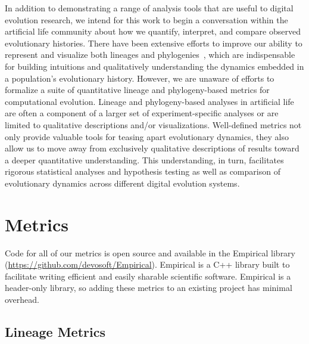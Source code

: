 \documentclass[letterpaper]{article}
\begin{document}
In addition to demonstrating a range of analysis tools that are useful to digital evolution research, we intend for this work to begin a conversation within the artificial life community about how we quantify, interpret, and compare observed evolutionary histories. There have been extensive efforts to improve our ability to represent and visualize both lineages and phylogenies~\citep{standish_visualising_2002,burlacu_visualization_2013, mcphee_using_2016,mcphee_visualizing_2016, lalejini_evolutionary_2016}, which are indispensable for building intuitions and qualitatively understanding the dynamics embedded in a population's evolutionary history. However, we are unaware of efforts to formalize a suite of quantitative lineage and phylogeny-based metrics for computational evolution. Lineage and phylogeny-based analyses in artificial life are often a component of a larger set of experiment-specific analyses or are limited to qualitative descriptions and/or visualizations. Well-defined metrics not only provide valuable tools for teasing apart evolutionary dynamics, they also allow us to move away from exclusively qualitative descriptions of results toward a deeper quantitative understanding. This understanding, in turn, facilitates rigorous statistical analyses and hypothesis testing as well as comparison of evolutionary dynamics across different digital evolution systems.


\section{Metrics}

Code for all of our metrics is open source and available in the Empirical library (\url{https://github.com/devosoft/Empirical}). Empirical is a C++ library built to facilitate writing efficient and easily sharable scientific software. Empirical is a header-only library, so adding these metrics to an existing project has minimal overhead.

\subsection{Lineage Metrics}
\end{document}
